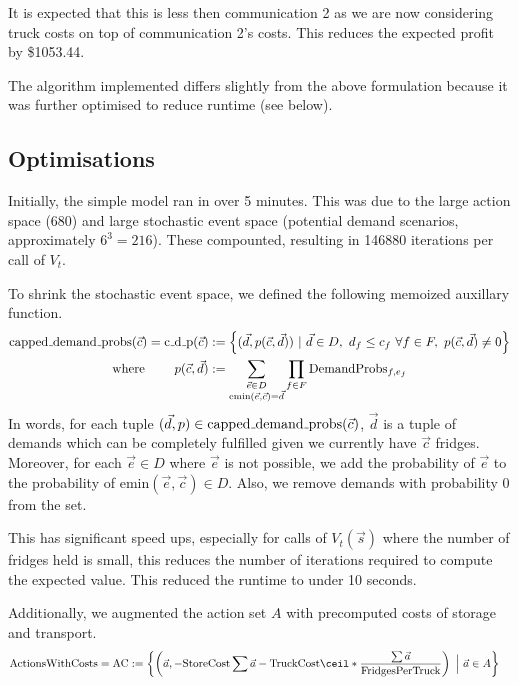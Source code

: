 \documentclass[11pt,a4paper]{article}
\begin{document}
It is expected that this is less then communication 2 as we are now considering 
truck costs on top of communication 2's costs. This 
reduces the expected profit by \$1053.44.

The algorithm implemented differs slightly from the above 
formulation because it was further optimised to reduce runtime (see below).

\subsection{Optimisations}
Initially, the simple model ran in over 5 minutes. This was due to the large 
action space (680) and large stochastic event space (potential demand scenarios, approximately $6^3=216$).
These compounted, resulting in 146880 iterations per call of $V_t$.

To shrink the stochastic event space, we defined the following memoized auxillary function.
\begin{align*}
    \mathrm{capped{\mathunderscore}demand{\mathunderscore}probs}(\vec c)  = \mathrm{c{\mathunderscore}d{\mathunderscore}p}(\vec c)&:= \left\{ (\vec d, p(\vec c, \vec d)) ~|~  \vec d \in D,~d_f \le c_f ~\forall f \in F, ~ p(\vec c, \vec d) \ne 0\right\} \\ 
    \text{where }\quad \quad p(\vec c, \vec d) &:= \sum_{\substack{\vec e \in D \\ \mathrm{emin}(\vec e, \vec c) = \vec d}} \prod_{f \in F}\mathrm{DemandProbs}_{f,e_f}
\end{align*}
In words, for each tuple $(\vec d, p) \in \mathrm{capped{\mathunderscore}demand{\mathunderscore}probs}(\vec c)$,
$\vec d$ is a tuple of demands which can be completely fulfilled given we currently have $\vec c$ 
fridges. Moreover, for each $\vec e \in D$ where $\vec e$ is not possible, we add 
the probability of $\vec e$ to the probability of $\mathrm{emin}(\vec e, \vec c) \in D$. 
Also, we remove demands with probability 0 from the set.

This has significant speed ups, especially for calls of $V_t(\vec s)$ where the number 
of fridges held is small, this reduces the number of iterations required to compute 
the expected value. This reduced the runtime to under 10 seconds.

Additionally, we augmented the action set $A$ with precomputed costs of storage and transport.
\begin{align*}
    \mathrm{ActionsWithCosts} = \mathrm{AC} &:= \left\{ \left(\vec a, 
    -\mathrm{StoreCost}\sum\vec a 
        -\mathrm{TruckCost} \ceil*{\frac{\sum \vec a}{\mathrm{FridgesPerTruck}}} \right) ~\Big|~ \vec a \in A\right\}
\end{align*}
\end{document}
